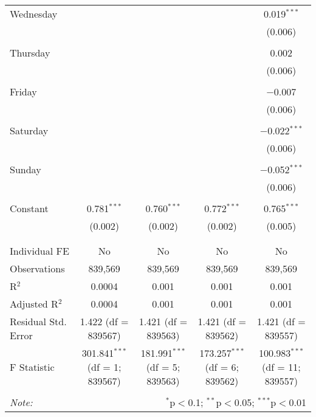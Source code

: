 \documentclass[
]{article}
\begin{document}
\begin{table}[!htbp]
{\begin{tabular}{@{\extracolsep{5pt}}lcccc}
 Wednesday &  &  &  & 0.019$^{***}$ \\ 
  &  &  &  & (0.006) \\ 
  & & & & \\ 
 Thursday &  &  &  & 0.002 \\ 
  &  &  &  & (0.006) \\ 
  & & & & \\ 
 Friday &  &  &  & $-$0.007 \\ 
  &  &  &  & (0.006) \\ 
  & & & & \\ 
 Saturday &  &  &  & $-$0.022$^{***}$ \\ 
  &  &  &  & (0.006) \\ 
  & & & & \\ 
 Sunday &  &  &  & $-$0.052$^{***}$ \\ 
  &  &  &  & (0.006) \\ 
  & & & & \\ 
 Constant & 0.781$^{***}$ & 0.760$^{***}$ & 0.772$^{***}$ & 0.765$^{***}$ \\ 
  & (0.002) & (0.002) & (0.002) & (0.005) \\ 
  & & & & \\ 
\hline \\[-1.8ex] 
Individual FE & No & No & No & No \\ 
Observations & 839,569 & 839,569 & 839,569 & 839,569 \\ 
R$^{2}$ & 0.0004 & 0.001 & 0.001 & 0.001 \\ 
Adjusted R$^{2}$ & 0.0004 & 0.001 & 0.001 & 0.001 \\ 
Residual Std. Error & 1.422 (df = 839567) & 1.421 (df = 839563) & 1.421 (df = 839562) & 1.421 (df = 839557) \\ 
F Statistic & 301.841$^{***}$ (df = 1; 839567) & 181.991$^{***}$ (df = 5; 839563) & 173.257$^{***}$ (df = 6; 839562) & 100.983$^{***}$ (df = 11; 839557) \\ 
\hline 
\hline \\[-1.8ex] 
\textit{Note:}  & \multicolumn{4}{r}{$^{*}$p$<$0.1; $^{**}$p$<$0.05; $^{***}$p$<$0.01} \\ 
\end{tabular}
} 
\end{table} 
\newpage
\end{document}
